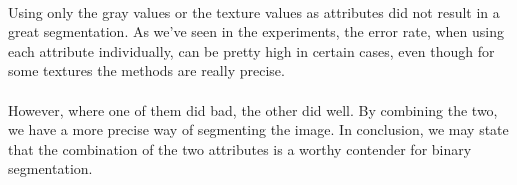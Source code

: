 \paragraph{}
Using only the gray values or the texture values as attributes did not result in a great segmentation.
As we've seen in the experiments, the error rate, when using each attribute individually, can be pretty high in certain cases, even though for some textures the methods are really precise.
\paragraph{}
However, where one of them did bad, the other did well. By combining the two, we have a more precise way of segmenting the image.
In conclusion, we may state that the combination of the two attributes is a worthy contender for binary segmentation. 